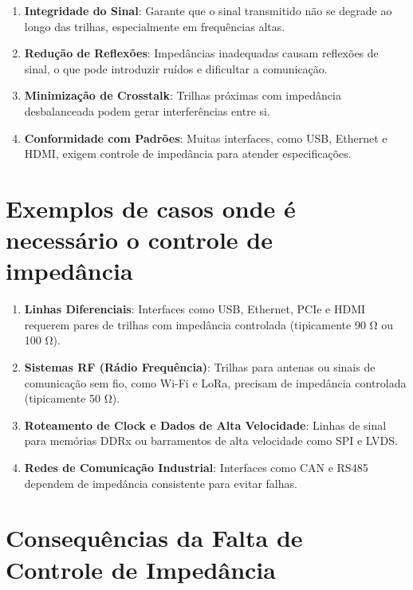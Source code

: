 \begin{enumerate}
\def\labelenumi{\arabic{enumi}.}
\item
  \textbf{Integridade do Sinal}: Garante que o sinal transmitido não se degrade ao
  longo das trilhas, especialmente em frequências altas.
\item
  \textbf{Redução de Reflexões}: Impedâncias inadequadas causam reflexões de
  sinal, o que pode introduzir ruídos e dificultar a comunicação.
\item
  \textbf{Minimização de Crosstalk}: Trilhas próximas com impedância
  desbalanceada podem gerar interferências entre si.
\item
  \textbf{Conformidade com Padrões}: Muitas interfaces, como USB, Ethernet e
  HDMI, exigem controle de impedância para atender especificações.
\end{enumerate}

\hypertarget{exemplos-de-casos-onde-uxe9-necessuxe1rio-o-controle-de-impeduxe2ncia}{%
\section{Exemplos de casos onde é necessário o controle de impedância}\label{exemplos-de-casos-onde-uxe9-necessuxe1rio-o-controle-de-impeduxe2ncia}}

\begin{enumerate}
\def\labelenumi{\arabic{enumi}.}
\item
  \textbf{Linhas Diferenciais}: Interfaces como USB, Ethernet, PCIe e HDMI
  requerem pares de trilhas com impedância controlada (tipicamente 90 Ω ou 100 Ω).
\item
  \textbf{Sistemas RF (Rádio Frequência)}: Trilhas para antenas ou sinais de
  comunicação sem fio, como Wi-Fi e LoRa, precisam de impedância controlada (tipicamente 50 Ω).
\item
  \textbf{Roteamento de Clock e Dados de Alta Velocidade}: Linhas de sinal para
  memórias DDRx ou barramentos de alta velocidade como SPI e LVDS.
\item
  \textbf{Redes de Comunicação Industrial}: Interfaces como CAN e RS485
  dependem de impedância consistente para evitar falhas.
\end{enumerate}

\hypertarget{consequuxeancias-da-falta-de-controle-de-impeduxe2ncia}{%
\section{Consequências da Falta de Controle de Impedância}\label{consequuxeancias-da-falta-de-controle-de-impeduxe2ncia}}

